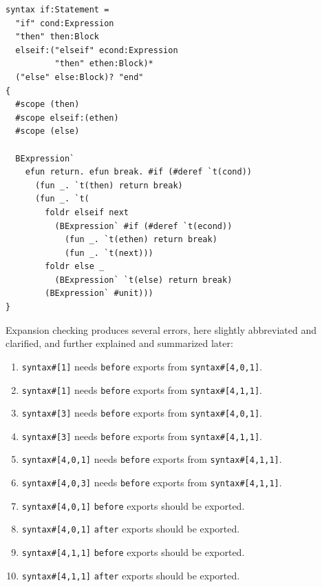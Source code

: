 \documentclass{kththesis}
\begin{document}
\begin{verbatim}
syntax if:Statement =
  "if" cond:Expression
  "then" then:Block
  elseif:("elseif" econd:Expression
          "then" ethen:Block)*
  ("else" else:Block)? "end"
{
  #scope (then)
  #scope elseif:(ethen)
  #scope (else)

  BExpression`
    efun return. efun break. #if (#deref `t(cond))
      (fun _. `t(then) return break)
      (fun _. `t(
        foldr elseif next
          (BExpression` #if (#deref `t(econd))
            (fun _. `t(ethen) return break)
            (fun _. `t(next)))
        foldr else _
          (BExpression` `t(else) return break)
        (BExpression` #unit)))
}
\end{verbatim}

Expansion checking produces several errors, here slightly abbreviated and clarified, and further explained and summarized later:
\begin{enumerate}
  \item \texttt{syntax#[1]} needs \texttt{before} exports from \texttt{syntax#[4,0,1]}.
  \item \texttt{syntax#[1]} needs \texttt{before} exports from \texttt{syntax#[4,1,1]}.
  \item \texttt{syntax#[3]} needs \texttt{before} exports from \texttt{syntax#[4,0,1]}.
  \item \texttt{syntax#[3]} needs \texttt{before} exports from \texttt{syntax#[4,1,1]}.
  \item \texttt{syntax#[4,0,1]} needs \texttt{before} exports from \texttt{syntax#[4,1,1]}.
  \item \texttt{syntax#[4,0,3]} needs \texttt{before} exports from \texttt{syntax#[4,1,1]}.
  \item \texttt{syntax#[4,0,1]} \texttt{before} exports should be exported.
  \item \texttt{syntax#[4,0,1]} \texttt{after} exports should be exported.
  \item \texttt{syntax#[4,1,1]} \texttt{before} exports should be exported.
  \item \texttt{syntax#[4,1,1]} \texttt{after} exports should be exported.
\end{enumerate}
\end{document}

